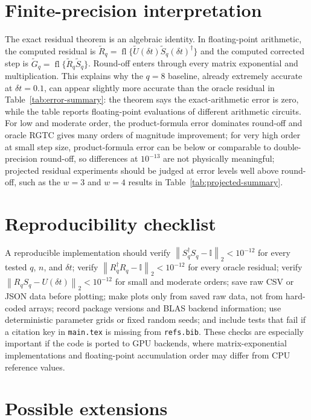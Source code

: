 \documentclass[aps,prxquantum,reprint,superscriptaddress,nofootinbib,amsmath,amssymb]{revtex4-2}
\newcommand{\rgtc}{RGTC}
\newcommand{\norm}[1]{\left\lVert #1 \right\rVert}
\newcommand{\id}{\mathbb{I}}
\newcommand{\dt}{\delta t}
\begin{document}
\section{Finite-precision interpretation}
\label{app:finite-precision}

The exact residual theorem is an algebraic identity. In floating-point arithmetic, the computed residual is $\widetilde R_q=\operatorname{fl}\{\widetilde U(\dt)\widetilde S_q(\dt)^\dagger\}$ and the computed corrected step is $\widetilde G_q=\operatorname{fl}\{\widetilde R_q\widetilde S_q\}$. Round-off enters through every matrix exponential and multiplication. This explains why the $q=8$ baseline, already extremely accurate at $\dt=0.1$, can appear slightly more accurate than the oracle residual in Table~\ref{tab:error-summary}: the theorem says the exact-arithmetic error is zero, while the table reports floating-point evaluations of different arithmetic circuits. For low and moderate order, the product-formula error dominates round-off and oracle \rgtc{} gives many orders of magnitude improvement; for very high order at small step size, product-formula error can be below or comparable to double-precision round-off, so differences at $10^{-13}$ are not physically meaningful; projected residual experiments should be judged at error levels well above round-off, such as the $w=3$ and $w=4$ results in Table~\ref{tab:projected-summary}.

\section{Reproducibility checklist}
\label{app:repro}

A reproducible implementation should verify $\norm{S_q^\dagger S_q-\id}_2<10^{-12}$ for every tested $q$, $n$, and $\dt$; verify $\norm{R_q^\dagger R_q-\id}_2<10^{-12}$ for every oracle residual; verify $\norm{R_qS_q-U(\dt)}_2<10^{-12}$ for small and moderate orders; save raw CSV or JSON data before plotting; make plots only from saved raw data, not from hard-coded arrays; record package versions and BLAS backend information; use deterministic parameter grids or fixed random seeds; and include tests that fail if a citation key in \texttt{main.tex} is missing from \texttt{refs.bib}. These checks are especially important if the code is ported to GPU backends, where matrix-exponential implementations and floating-point accumulation order may differ from CPU reference values.

\section{Possible extensions}
\label{app:extensions}
\end{document}
